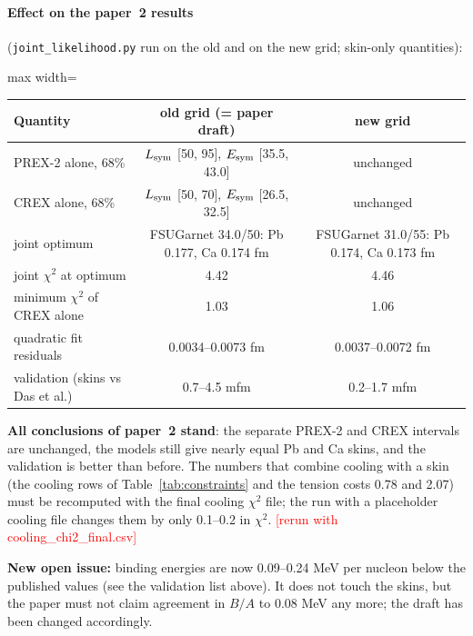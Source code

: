 \documentclass[11pt,a4paper]{article}
\newcommand{\fillin}[1]{\textcolor{red}{[#1]}}
\newcommand{\Esym}{E_{\rm sym}}
\newcommand{\Lsym}{L_{\rm sym}}
\begin{document}
\paragraph{Effect on the paper~2 results} (\texttt{joint\_likelihood.py} run on the old and on the new grid; skin-only quantities):
\begin{center}
\begin{adjustbox}{max width=\linewidth}
\begin{tabular}{lcc}
\toprule
Quantity & old grid (= paper draft) & new grid\\
\midrule
PREX-2 alone, 68\% & $\Lsym$ [50, 95], $\Esym$ [35.5, 43.0] & unchanged\\
CREX alone, 68\% & $\Lsym$ [50, 70], $\Esym$ [26.5, 32.5] & unchanged\\
joint optimum & FSUGarnet 34.0/50: Pb 0.177, Ca 0.174 fm & FSUGarnet 31.0/55: Pb 0.174, Ca 0.173 fm\\
joint $\chi^2$ at optimum & 4.42 & 4.46\\
minimum $\chi^2$ of CREX alone & 1.03 & 1.06\\
quadratic fit residuals & 0.0034--0.0073 fm & 0.0037--0.0072 fm\\
validation (skins vs Das et al.) & 0.7--4.5 mfm & 0.2--1.7 mfm\\
\bottomrule
\end{tabular}
\end{adjustbox}
\end{center}
\textbf{All conclusions of paper~2 stand}: the separate PREX-2 and CREX intervals are unchanged, the models still give nearly equal Pb and Ca skins, and the validation is better than before. The numbers that combine cooling with a skin (the cooling rows of Table~\ref{tab:constraints} and the tension costs 0.78 and 2.07) must be recomputed with the final cooling $\chi^2$ file; the run with a placeholder cooling file changes them by only 0.1--0.2 in $\chi^2$. \fillin{rerun with cooling\_chi2\_final.csv}

\noindent\textbf{New open issue:} binding energies are now 0.09--0.24 MeV per nucleon below the published values (see the validation list above). It does not touch the skins, but the paper must not claim agreement in $B/A$ to 0.08 MeV any more; the draft has been changed accordingly.

\end{document}
